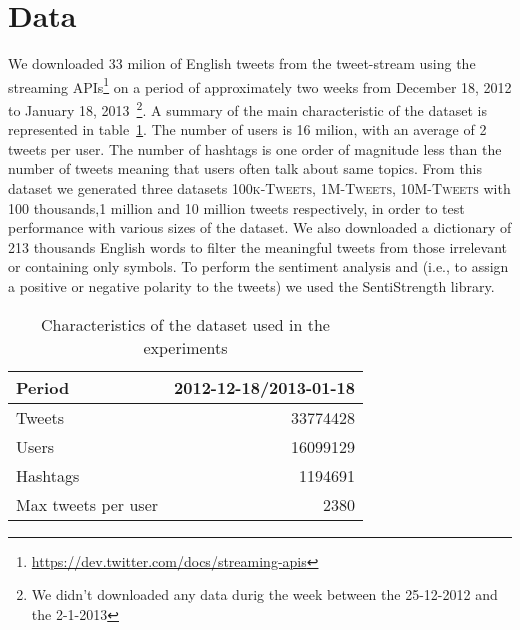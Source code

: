 \section{Data}
\label{sec:data}

We downloaded 33 milion of English tweets from the tweet-stream using the streaming APIs\footnote{\url{https://dev.twitter.com/docs/streaming-apis}} on a period of approximately two weeks from December 18, 2012 to January 18, 2013~\footnote{We didn't downloaded any data durig the week between the 25-12-2012 and the 2-1-2013}. 
A summary of the main characteristic of the dataset is represented in table~\ref{tbl:dataset}.
The number of users is 16 milion, with an average of 2 tweets per user. 
The number of hashtags is one order of magnitude less than the number of tweets meaning that users often talk about same topics.
From this dataset we generated three datasets \textsc{100k-Tweets}, \textsc{1M-Tweets}, \textsc{10M-Tweets} with 100 thousands,1 million and 10 million tweets respectively, in order to test performance with various sizes of the dataset. 
We also downloaded a dictionary of 213 thousands English words to filter the meaningful tweets from those irrelevant or containing only symbols. 
To perform the sentiment analysis and (i.e., to assign a positive or negative polarity to the tweets) we used the SentiStrength library. 

\begin{table}[htb]
\centering 
\begin{tabular}{|l|r|}
\hline		
Period			& 2012-12-18/2013-01-18\\
\hline
Tweets			&	33774428\\
Users 			&	16099129\\
Hashtags 		&	1194691\\
Max tweets per user & 2380\\  
\hline
\end{tabular}
\caption{Characteristics of the dataset used in the experiments}
\label{tbl:dataset}
\end{table}

